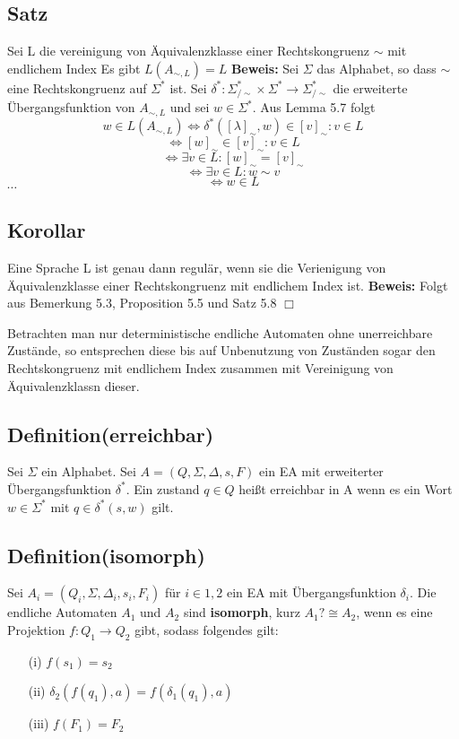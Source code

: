 \documentclass[a4paper,11pt]{article}
\begin{document}
\subsection{Satz} Sei L die vereinigung von Äquivalenzklasse einer Rechtskongruenz $\sim$ mit endlichem Index Es gibt $L(A_{\sim, L}) = L$ \textbf{Beweis: } Sei $\Sigma$ das Alphabet, so dass $\sim$ eine Rechtskongruenz auf $\Sigma^{*}$ ist. Sei $\delta^{*} : \Sigma^{*}_{/\sim} \times \Sigma^{*} \rightarrow \Sigma^{*}_{/\sim}$ die erweiterte Übergangsfunktion von $A_{\sim, L}$ und sei $w \in \Sigma^{*}$. Aus Lemma 5.7 folgt 
\[w \in L(A_{\sim, L}) \Leftrightarrow \delta^{*}([\lambda]_{\sim}, w) \in {[v]_{\sim} : v \in L}\]
\[\Leftrightarrow [w]_{\sim} \in {[v]_{\sim} : v\in L}\]
\[\Leftrightarrow \exists v \in L : [w]_{\sim} = [v]_{\sim}\]
\[\Leftrightarrow \exists v \in L : w \sim v\]
\[\Leftrightarrow w \in L\]
$\cdots$

\subsection{Korollar} Eine Sprache L ist genau dann regulär, wenn sie die Verienigung von Äquivalenzklasse einer Rechtskongruenz mit endlichem Index ist. \textbf{Beweis: }Folgt aus Bemerkung 5.3, Proposition 5.5 und Satz 5.8 $\Box$ 

Betrachten man nur deterministische endliche Automaten ohne unerreichbare Zustände, so entsprechen diese bis auf Unbenutzung von Zuständen sogar den Rechtskongruenz mit endlichem Index zusammen mit Vereinigung von Äquivalenzklassn dieser.

\subsection{Definition(erreichbar)} Sei $\Sigma$ ein Alphabet. Sei $A = (Q, \Sigma, \Delta, s, F)$ ein EA mit erweiterter Übergangsfunktion $\delta^{*}$. Ein zustand $q\in Q$ heißt erreichbar in A wenn es ein Wort $w \in \Sigma ^{*}$ mit $q\in \delta^{*}(s, w)$ gilt.

\subsection{Definition(isomorph)} Sei $A_{i} = (Q_{i}, \Sigma, \Delta_{i}, s_{i}, F_{i})$ für $i \in {1,2}$ ein EA mit Übergangsfunktion $\delta_{i}$. Die endliche Automaten $A_{1}$ und $A_{2}$ sind \textbf{isomorph}, kurz $A_{1}? \cong A_{2}$, wenn es eine Projektion $f:Q_{1}\rightarrow Q_{2}$ gibt, sodass folgendes gilt:
\begin{itemize}
    \item [(i)] $f(s_{1}) = s_{2}$
    \item [(ii)] $\delta_{2}(f(q_{1}), a) = f(\delta_{1}(q_{1}), a)$
    \item [(iii)] $f(F_1) = F_2$
\end{itemize}
\end{document}
